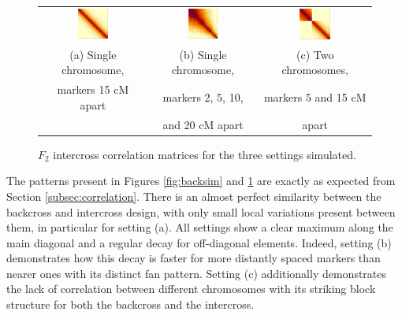 \documentclass{article}
\begin{document}
\begin{figure}[htp]
  \begin{center}
    \begin{tabular}{ccc}
      \includegraphics[width = 0.300\textwidth]{./img/inter1.png} &
      \includegraphics[width = 0.300\textwidth]{./img/inter2.png} &
      \includegraphics[width = 0.300\textwidth]{./img/inter3.png} \\
      {\footnotesize (a) Single chromosome,} &
      {\footnotesize (b) Single chromosome,} &
      {\footnotesize (c) Two chromosomes,} \\
      {\footnotesize markers 15 cM apart} &
      {\footnotesize markers 2, 5, 10, } &
      {\footnotesize markers 5 and 15 cM} \\
      &
      {\footnotesize and 20 cM apart} &
      {\footnotesize apart} \\ 
    \end{tabular}
  \end{center}
  \caption{$F_2$ intercross correlation matrices for the three settings simulated.}
  \label{fig:intersim}
\end{figure}

The patterns present in Figures \ref{fig:backsim} and \ref{fig:intersim} are exactly as expected from Section \ref{subsec:correlation}. There is an almost perfect similarity between the backcross and intercross design, with only small local variations present between them, in particular for setting (a). All settings show a clear maximum along the main diagonal and a regular decay for off-diagonal elements. Indeed, setting (b) demonstrates how this decay is faster for more distantly spaced markers than nearer ones with its distinct fan pattern. Setting (c) additionally demonstrates the lack of correlation between different chromosomes with its striking block structure for both the backcross and the intercross.
\end{document}
